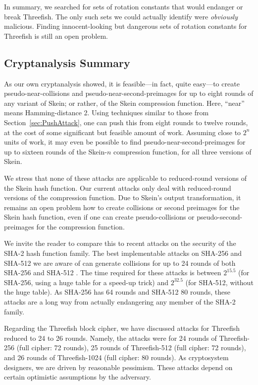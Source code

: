\documentclass[11pt,twoside]{article}
\begin{document}
In summary, we searched for sets of rotation constants that would endanger or break Threefish.  The only such sets we could actually identify were \emph{obviously} malicious. Finding innocent-looking but dangerous sets of rotation constants for Threefish is still an open problem.

\subsection{Cryptanalysis Summary}

As our own cryptanalysis showed, it is feasible---in fact, quite easy---to create pseudo-near-collisions and pseudo-near-second-preimages for up to eight rounds of any variant of Skein; or rather, of the Skein compression function.  Here, ``near'' means Hamming-distance 2.  Using techniques similar to those from Section~\ref{sec:PushAttack}, one can push this from eight rounds to twelve rounds, at the cost of some significant but feasible amount of work. Assuming close to $2^n$ units of work, it may even be possible to find pseudo-near-second-preimages for up to sixteen rounds of the Skein-$n$ compression function, for all three versions of Skein.

We stress that none of these attacks are applicable to reduced-round versions of the Skein hash function.  Our current attacks only deal with reduced-round versions of the compression function.  Due to Skein's output transformation, it remains an open problem how to create collisions or second preimages for the Skein hash function, even if one can create pseudo-collisions or pseudo-second-preimages for the compression function.

We invite the reader to compare this to recent attacks on the security of the SHA-2 hash function family. The best implementable attacks on SHA-256 and SHA-512 we are aware of can generate collisions for up to 24 rounds of both SHA-256 and SHA-512 \cite{SS08a}. The time required for these attacks is between $2^{15.5}$ (for SHA-256, using a huge table for a speed-up trick) and $2^{32.5}$ (for SHA-512, without the huge table). As SHA-256 has 64 rounds and SHA-512 80 rounds, these attacks are a long way from actually endangering any member of the SHA-2 family. 

Regarding the Threefish block cipher, we have discussed attacks for Threefish reduced to 24 to 26 rounds. Namely, the attacks were for 24 rounds of Threefish-256 (full cipher: 72 rounds), 25 rounds of Threefish-512 (full cipher: 72 rounds), and 26 rounds of Threefish-1024 (full cipher: 80 rounds). As cryptosystem designers, we are driven by reasonable pessimism. These attacks depend on certain optimistic assumptions by the adversary. 
\end{document}
